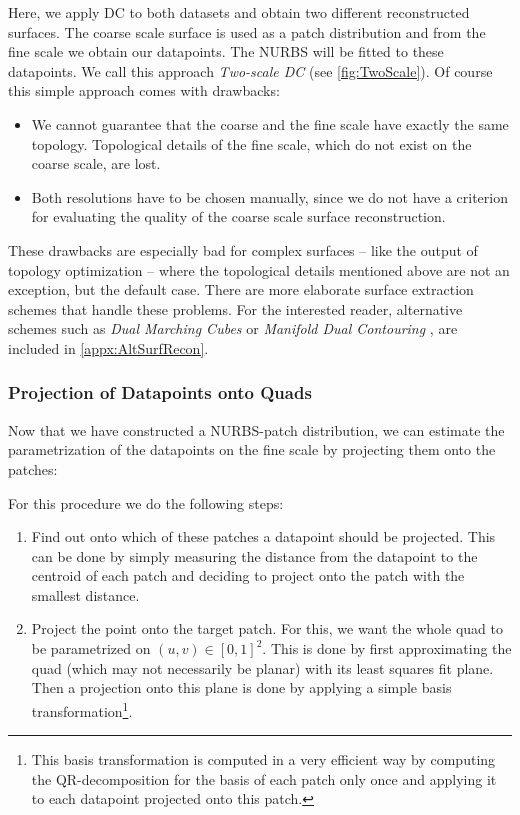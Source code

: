 Here, we apply \ac{DC} to both datasets and obtain two different reconstructed surfaces.
The coarse scale surface is used as a patch distribution and from the fine scale we obtain our datapoints. The \ac{NURBS} will be fitted to these datapoints. We call this approach \emph{Two-scale \acl{DC}} (see \autoref{fig:TwoScale}).
Of course this simple approach comes with drawbacks:
\begin{itemize}
\item We cannot guarantee that the coarse and the fine scale have exactly the same topology. Topological details of the fine scale, which do not exist on the coarse scale, are lost.
\item Both resolutions have to be chosen manually, since we do not have a criterion for evaluating the quality of the coarse scale surface reconstruction.
\end{itemize}
These drawbacks are especially bad for complex surfaces -- like the output of topology optimization -- where the topological details mentioned above are not an exception, but the default case. There are more elaborate surface extraction schemes that handle these problems. For the interested reader, alternative schemes such as \emph{Dual Marching Cubes} \cite{ScottSchaefer2004} or \emph{Manifold Dual Contouring} \cite{Schaefer2007}, are included in \autoref{appx:AltSurfRecon}.
\subsubsection{Projection of Datapoints onto Quads}
Now that we have constructed a \ac{NURBS}-patch distribution, we can estimate the parametrization of the datapoints on the fine scale by projecting them onto the patches: 

For this procedure we do the following steps:

\begin{enumerate}
\item Find out onto which of these patches a datapoint should be projected. This can be done by simply measuring the distance from the datapoint to the centroid of each patch and deciding to project onto the patch with the smallest distance.
\item Project the point onto the target patch. For this, we want the whole \ac{quad} to be parametrized on $\left(u,v\right)\in\left[0,1\right]^2$. This is done by first approximating the quad (which may not necessarily be planar) with its least squares fit plane. Then a projection onto this plane is done by applying a simple basis transformation\footnote{This basis transformation is computed in a very efficient way by computing the QR-decomposition for the basis of each patch only once and applying it to each datapoint projected onto this patch.}.
\end{enumerate}

